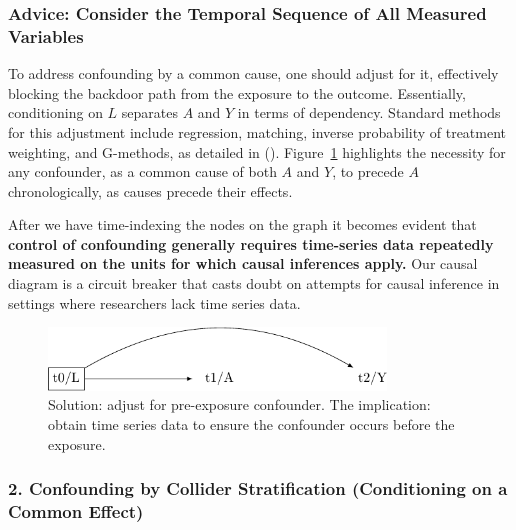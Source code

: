 \documentclass[
  singlecolumn,
  9pt]{article}
\begin{document}
\subsubsection{Advice: Consider the Temporal Sequence of All Measured
Variables}\label{advice-consider-the-temporal-sequence-of-all-measured-variables}

To address confounding by a common cause, one should adjust for it,
effectively blocking the backdoor path from the exposure to the outcome.
Essentially, conditioning on \(L\) separates \(A\) and \(Y\) in terms of
dependency. Standard methods for this adjustment include regression,
matching, inverse probability of treatment weighting, and G-methods, as
detailed in ().
Figure~\ref{fig-dag-common-cause-solution} highlights the necessity for
any confounder, as a common cause of both \(A\) and \(Y\), to precede
\(A\) chronologically, as causes precede their effects.

After we have time-indexing the nodes on the graph it becomes evident
that \textbf{control of confounding generally requires time-series data
repeatedly measured on the units for which causal inferences apply.} Our
causal diagram is a circuit breaker that casts doubt on attempts for
causal inference in settings where researchers lack time series data.

\begin{figure}

{\centering \includegraphics[width=0.8\textwidth,height=\textheight]{causal-dags_files/figure-pdf/fig-dag-common-cause-solution-1.pdf}

}

\caption{\label{fig-dag-common-cause-solution}Solution: adjust for
pre-exposure confounder. The implication: obtain time series data to
ensure the confounder occurs before the exposure.}

\end{figure}

\subsubsection{2. Confounding by Collider Stratification (Conditioning
on a Common
Effect)}\label{confounding-by-collider-stratification-conditioning-on-a-common-effect}
\end{document}
